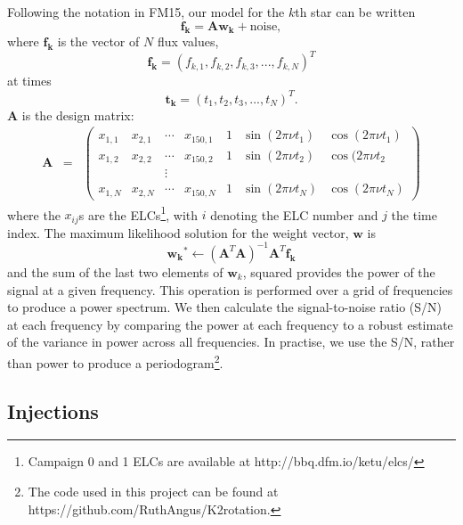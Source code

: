 \documentclass[useAMS, usenatbib]{aastex}
\begin{document}
Following the notation in FM15, our model for the $k$th star can be written
\begin{equation}
	\mathbf{f_k} = \mathbf{A}\mathbf{w_k} + \mathrm{noise},
\end{equation}
where $\mathbf{f_k}$ is the vector of $N$ flux values,
\begin{equation}
	\mathbf{f_k} = (f_{k,1}, f_{k,2}, f_{k,3}, ..., f_{k,N})^T
\end{equation}
at times
\begin{equation}
	\mathbf{t_k} = (t_1, t_2, t_3, ..., t_N)^T.
\end{equation}
$\mathbf{A}$ is the design matrix:
\begin{eqnarray}
	\mathbf{A} &=& \left (\begin{array}{ccccccc}
	x_{1,1} & x_{2,1} & \cdots & x_{150,1} & 1 & \sin(2\pi\nu t_1) & \cos(2\pi\nu t_1) \\
	x_{1,2} & x_{2,2} & \cdots & x_{150,2} & 1 & \sin(2\pi\nu t_2) & \cos(2\pi\nu t_2\\
    && \vdots &&&\\
	x_{1,N} & x_{2,N} & \cdots & x_{150,N} & 1 & \sin(2\pi\nu t_N) & \cos(2\pi\nu t_N)
\end{array}\right )
\end{eqnarray}
where the $x_{ij}$s are the ELCs\footnote{Campaign 0 and 1 ELCs are
available at http://bbq.dfm.io/ketu/elcs/}, with $i$ denoting the ELC number
and $j$ the time index. The maximum likelihood solution for the weight vector,
$\mathbf{w}$ is
\begin{equation}
	\mathbf{w_k}^* \gets (\mathbf{A}^T\mathbf{A})^{-1}\mathbf{A}^T\mathbf{f_k} \end{equation}
and the sum of the last two elements of $\mathbf{w}_k$, squared provides the
power of the signal at a given frequency.
This operation is performed over a grid of frequencies to produce a power
spectrum.
We then calculate the signal-to-noise ratio (S/N) at each frequency by
comparing the power at each frequency to a robust estimate of the variance in
power across all frequencies.
In practise, we use the S/N, rather than power to produce a
periodogram\footnote{The code used in this project can be found at
https://github.com/RuthAngus/K2rotation.}.

\subsection{Injections}
\end{document}
